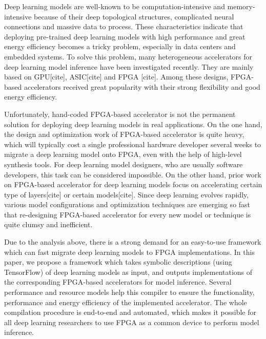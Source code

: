 \documentclass{acm_proc_article-sp-copy}
\begin{document}
Deep learning models are well-known to be computation-intensive and memory-intensive because of their deep topological structures, complicated neural connections and massive data to process. These characteristics indicate that deploying pre-trained deep learning models with high performance and great energy efficiency becomes a tricky problem, especially in data centers and embedded systems. To solve this problem, many heterogeneous accelerators for deep learning model inference have been investigated recently. They are mainly based on GPU[cite], ASIC[cite] and FPGA [cite]. Among these designs, FPGA-based accelerators received great popularity with their strong flexibility and good energy efficiency.

Unfortunately, hand-coded FPGA-based accelerator is not the permanent solution for deploying deep learning models in real applications. On the one hand, the design and optimization work of FPGA-based accelerator is quite heavy, which will typically cost a single professional hardware developer several weeks to migrate a deep learning model onto FPGA, even with the help of high-level synthesis tools. For deep learning model designers, who are usually software developers, this task can be considered impossible. On the other hand, prior work on FPGA-based accelerator for deep learning models focus on accelerating certain type of layers[cite] or certain models[cite]. Since deep learning evolves rapidly, various model configurations and optimization techniques are emerging so fast that re-designing FPGA-based accelerator for every new model or technique is quite clumsy and inefficient.

Due to the analysis above, there is a strong demand for an easy-to-use framework which can fast migrate deep learning models to FPGA implementations. In this paper, we propose a framework which takes symbolic descriptions (using TensorFlow) of deep learning models as input, and outputs implementations of the corresponding FPGA-based accelerators for model inference. Several performance and resource models help this compiler to ensure the functionality, performance and energy efficiency of the implemented accelerator. The whole compilation procedure is end-to-end and automated, which makes it possible for all deep learning researchers to use FPGA as a common device to perform model inference.
\end{document}

